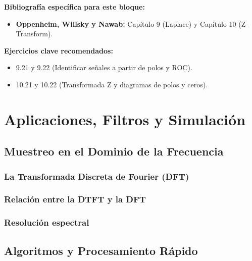 \documentclass[11pt,a4paper,openany]{book}
\begin{document}
\textbf{Bibliografía específica para este bloque:}
\begin{itemize}
	\item \textbf{Oppenheim, Willsky y Nawab:} Capítulo 9 (Laplace) y Capítulo 10 (Z-Transform).
\end{itemize}

\textbf{Ejercicios clave recomendados:}
\begin{itemize}
	\item 9.21 y 9.22 (Identificar señales a partir de polos y ROC).
	\item 10.21 y 10.22 (Transformada Z y diagramas de polos y ceros).
\end{itemize}


\part{Aplicaciones, Filtros y Simulación}


\chapter{Muestreo en el Dominio de la Frecuencia}

\section{La Transformada Discreta de Fourier (DFT)}

\section{Relación entre la DTFT y la DFT}

\section{Resolución espectral}

\chapter{Algoritmos y Procesamiento Rápido}
\end{document}
